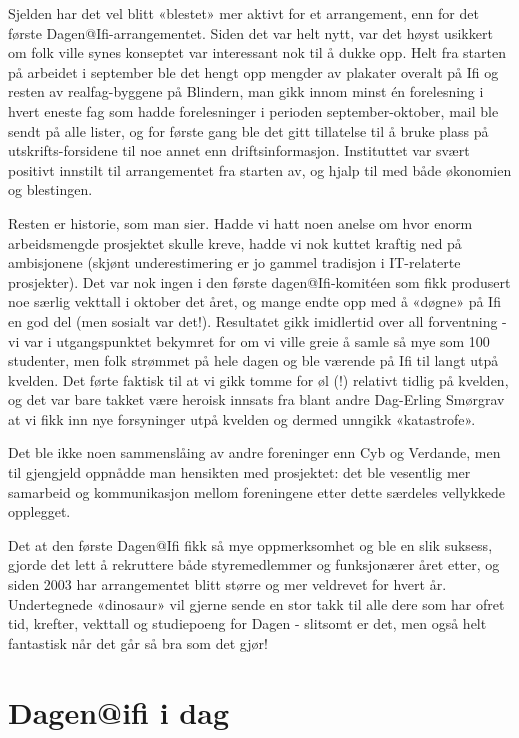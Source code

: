 Sjelden har det vel blitt «blestet» mer aktivt for et arrangement, enn for det første Dagen@Ifi-arrangementet. Siden det var helt nytt, var det høyst usikkert om folk ville synes konseptet var interessant nok til å dukke opp. Helt fra starten på arbeidet i september ble det hengt opp mengder av plakater overalt på Ifi og resten av realfag-byggene på Blindern, man gikk innom minst én forelesning i hvert eneste fag som hadde forelesninger i perioden september-oktober, mail ble sendt på alle lister, og for første gang ble det gitt tillatelse til å bruke plass på utskrifts-forsidene til noe annet enn driftsinformasjon. Instituttet var svært positivt innstilt til arrangementet fra starten av, og hjalp til med både økonomien og blestingen.

Resten er historie, som man sier. Hadde vi hatt noen anelse om hvor enorm arbeidsmengde prosjektet skulle kreve, hadde vi nok kuttet kraftig ned på ambisjonene (skjønt underestimering er jo gammel tradisjon i IT-relaterte prosjekter). Det var nok ingen i den første dagen@Ifi-komitéen som fikk produsert noe særlig vekttall i oktober det året, og mange endte opp med å «døgne» på Ifi en god del (men sosialt var det!). Resultatet gikk imidlertid over all forventning - vi var i utgangspunktet bekymret for om vi ville greie å samle så mye som 100 studenter, men folk strømmet på hele dagen og ble værende på Ifi til langt utpå kvelden. Det førte faktisk til at vi gikk tomme for øl (!) relativt tidlig på kvelden, og det var bare takket være heroisk innsats fra blant andre Dag-Erling Smørgrav at vi fikk inn nye forsyninger utpå kvelden og dermed unngikk «katastrofe».

Det ble ikke noen sammenslåing av andre foreninger enn Cyb og Verdande, men til gjengjeld oppnådde man hensikten med prosjektet: det ble vesentlig mer samarbeid og kommunikasjon mellom foreningene etter dette særdeles vellykkede opplegget.

Det at den første Dagen@Ifi fikk så mye oppmerksomhet og ble en slik suksess, gjorde det lett å rekruttere både styremedlemmer og funksjonærer året etter, og siden 2003 har arrangementet blitt større og mer veldrevet for hvert år. Undertegnede «dinosaur» vil gjerne sende en stor takk til alle dere som har ofret tid, krefter, vekttall og studiepoeng for Dagen - slitsomt er det, men også helt fantastisk når det går så bra som det gjør!

\section{Dagen@ifi i dag}

